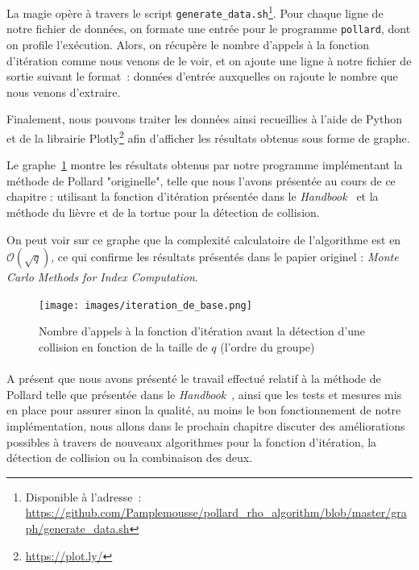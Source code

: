       La magie opère à travers le script \lstinline{generate_data.sh}\footnote{Disponible à l'adresse~: \url{https://github.com/Pamplemousse/pollard_rho_algorithm/blob/master/graph/generate_data.sh}}.
      Pour chaque ligne de notre fichier de données, on formate une entrée pour le programme \lstinline{pollard}, dont on profile l'exécution.
      Alors, on récupère le nombre d'appels à la fonction d'itération comme nous venons de le voir, et on ajoute une ligne à notre fichier de sortie suivant le format~: données d'entrée auxquelles on rajoute le nombre que nous venons d'extraire.

      Finalement, nous pouvons traiter les données ainsi recueillies à l'aide de Python et de la librairie Plotly\footnote{\url{https://plot.ly/}} afin d'afficher les résultats obtenus sous forme de graphe.

      Le graphe~\ref{fig:basic_iteration_results} montre les résultats obtenus par notre programme implémentant la méthode de Pollard "originelle", telle que nous l'avons présentée au cours de ce chapitre : utilisant la fonction d'itération présentée dans le \textit{Handbook}~\autocite[107]{handbook} et la méthode du lièvre et de la tortue pour la détection de collision.

      On peut voir sur ce graphe que la complexité calculatoire de l'algorithme est en $\mathcal{O}(\sqrt{q})$, ce qui confirme les résultats présentés dans le papier originel : \textit{Monte Carlo Methods for Index Computation}\autocite{pollard0}.

      \begin{figure}
        \center{}
        \texttt{[image: images/iteration\_de\_base.png]}
        \caption{Nombre d'appels à la fonction d'itération avant la détection d'une collision en fonction de la taille de $q$ (l'ordre du groupe)}
        \label{fig:basic_iteration_results}
      \end{figure}


    \paragraph{}
    A présent que nous avons présenté le travail effectué relatif à la méthode de Pollard telle que présentée dans le \textit{Handbook}~\autocite[106]{handbook}, ainsi que les tests et mesures mis en place pour assurer sinon la qualité, au moins le bon fonctionnement de notre implémentation, nous allons dans le prochain chapitre discuter des améliorations possibles à travers de nouveaux algorithmes pour la fonction d'itération, la détection de collision ou la combinaison des deux.

